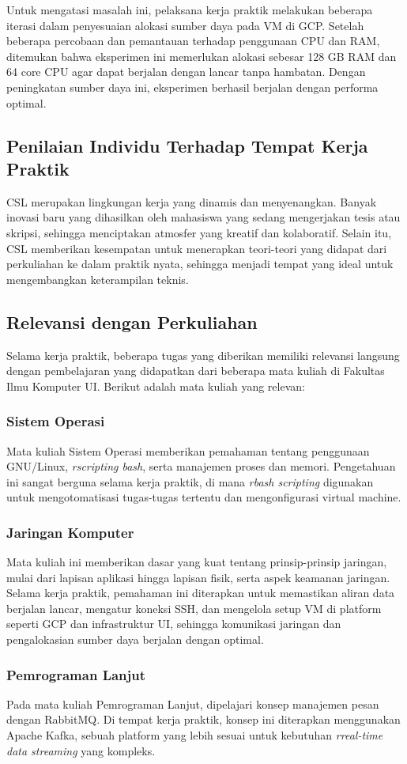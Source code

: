 Untuk mengatasi masalah ini, pelaksana kerja praktik melakukan beberapa iterasi dalam penyesuaian alokasi sumber daya pada VM di GCP. Setelah beberapa percobaan dan pemantauan terhadap penggunaan CPU dan RAM, ditemukan bahwa eksperimen ini memerlukan alokasi sebesar 128 GB RAM dan 64 core CPU agar dapat berjalan dengan lancar tanpa hambatan. Dengan peningkatan sumber daya ini, eksperimen berhasil berjalan dengan performa optimal.

\subsection{Penilaian Individu Terhadap Tempat Kerja Praktik}

CSL merupakan lingkungan kerja yang dinamis dan menyenangkan. Banyak inovasi baru yang dihasilkan oleh mahasiswa yang sedang mengerjakan tesis atau skripsi, sehingga menciptakan atmosfer yang kreatif dan kolaboratif. Selain itu, CSL memberikan kesempatan untuk menerapkan teori-teori yang didapat dari perkuliahan ke dalam praktik nyata, sehingga menjadi tempat yang ideal untuk mengembangkan keterampilan teknis.

\subsection{Relevansi dengan Perkuliahan}

Selama kerja praktik, beberapa tugas yang diberikan memiliki relevansi langsung dengan pembelajaran yang didapatkan dari beberapa mata kuliah di Fakultas Ilmu Komputer UI. Berikut adalah mata kuliah yang relevan:

\subsubsection{Sistem Operasi}
Mata kuliah Sistem Operasi memberikan pemahaman tentang penggunaan GNU/Linux, \textit{rscripting bash}, serta manajemen proses dan memori. Pengetahuan ini sangat berguna selama kerja praktik, di mana \textit{rbash scripting} digunakan untuk mengotomatisasi tugas-tugas tertentu dan mengonfigurasi virtual machine.

\subsubsection{Jaringan Komputer}
Mata kuliah ini memberikan dasar yang kuat tentang prinsip-prinsip jaringan, mulai dari lapisan aplikasi hingga lapisan fisik, serta aspek keamanan jaringan. Selama kerja praktik, pemahaman ini diterapkan untuk memastikan aliran data berjalan lancar, mengatur koneksi SSH, dan mengelola setup VM di platform seperti GCP dan infrastruktur UI, sehingga komunikasi jaringan dan pengalokasian sumber daya berjalan dengan optimal.

\subsubsection{Pemrograman Lanjut}
Pada mata kuliah Pemrograman Lanjut, dipelajari konsep manajemen pesan dengan RabbitMQ. Di tempat kerja praktik, konsep ini diterapkan menggunakan Apache Kafka, sebuah platform yang lebih sesuai untuk kebutuhan \textit{rreal-time data streaming} yang kompleks.
